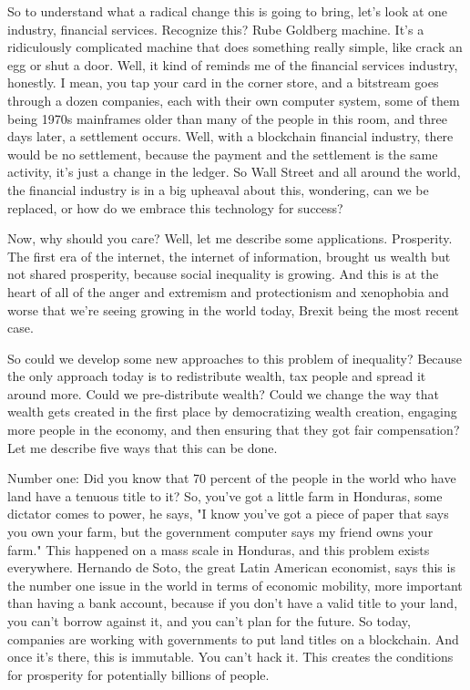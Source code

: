 \documentclass[a4paper]{article}
\begin{document}
So to understand what a radical change this is going to bring, let's look at one industry, financial services. Recognize this? Rube Goldberg machine. It's a ridiculously complicated machine that does something really simple, like crack an egg or shut a door. Well, it kind of reminds me of the financial services industry, honestly. I mean, you tap your card in the corner store, and a bitstream goes through a dozen companies, each with their own computer system, some of them being 1970s mainframes older than many of the people in this room, and three days later, a settlement occurs. Well, with a blockchain financial industry, there would be no settlement, because the payment and the settlement is the same activity, it's just a change in the ledger. So Wall Street and all around the world, the financial industry is in a big upheaval about this, wondering, can we be replaced, or how do we embrace this technology for success?

Now, why should you care? Well, let me describe some applications. Prosperity. The first era of the internet, the internet of information, brought us wealth but not shared prosperity, because social inequality is growing. And this is at the heart of all of the anger and extremism and protectionism and xenophobia and worse that we're seeing growing in the world today, Brexit being the most recent case.

So could we develop some new approaches to this problem of inequality? Because the only approach today is to redistribute wealth, tax people and spread it around more. Could we pre-distribute wealth? Could we change the way that wealth gets created in the first place by democratizing wealth creation, engaging more people in the economy, and then ensuring that they got fair compensation? Let me describe five ways that this can be done.

Number one: Did you know that 70 percent of the people in the world who have land have a tenuous title to it? So, you've got a little farm in Honduras, some dictator comes to power, he says, "I know you've got a piece of paper that says you own your farm, but the government computer says my friend owns your farm." This happened on a mass scale in Honduras, and this problem exists everywhere. Hernando de Soto, the great Latin American economist, says this is the number one issue in the world in terms of economic mobility, more important than having a bank account, because if you don't have a valid title to your land, you can't borrow against it, and you can't plan for the future.
So today, companies are working with governments to put land titles on a blockchain. And once it's there, this is immutable. You can't hack it. This creates the conditions for prosperity for potentially billions of people.
\end{document}
